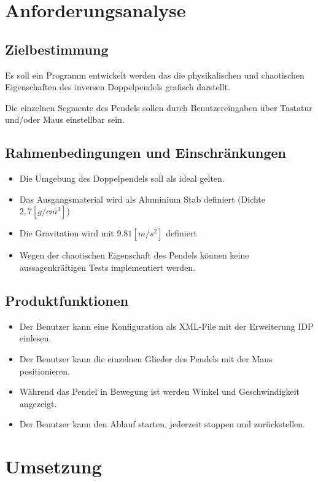 \documentclass[12pt]{article}
\numberwithin{equation}{subsection}
\begin{document}
\newpage
\section{Anforderungsanalyse}
\subsection{Zielbestimmung}
Es soll ein Programm entwickelt werden das die physikalischen und chaotischen Eigenschaften des inversen Doppelpendels grafisch darstellt.

Die einzelnen Segmente des Pendels sollen durch Benutzereingaben über Tastatur und/oder Maus einstellbar sein.

\subsection{Rahmenbedingungen und Einschränkungen}
\begin{itemize}
	\item Die Umgebung des Doppelpendels soll als ideal gelten.
	\item Das Ausgangsmaterial wird als Aluminium Stab definiert (Dichte $2,7 [g/cm^3]$)
	\item Die Gravitation wird mit $9.81 [m/s^2]$ definiert
	\item Wegen der chaotischen Eigenschaft des Pendels können keine aussagenkräftigen Tests implementiert werden.
\end{itemize}

\subsection{Produktfunktionen}
\begin{itemize}
	\item Der Benutzer kann eine Konfiguration als XML-File mit der Erweiterung IDP einlesen.
	\item Der Benutzer kann die einzelnen Glieder des Pendels mit der Maus positionieren.
	\item Während das Pendel in Bewegung ist werden Winkel und Geschwindigkeit angezeigt.
	\item Der Benutzer kann den Ablauf starten, jederzeit stoppen und zurückstellen.
\end{itemize}

\newpage
\section{Umsetzung}
\end{document}
